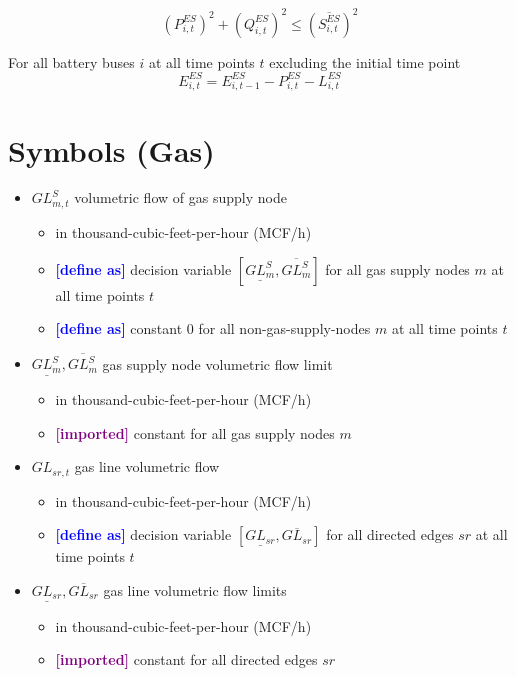 \documentclass{article}
\newcommand{\lo}[1]{\underline{#1}}
\newcommand{\hi}[1]{\overline{#1}}
\newcommand{\define}{\textcolor{blue}{\textbf{[define as] }}}
\newcommand{\imported}{\textcolor{purple}{\textbf{[imported] }}}
\begin{document}
\begin{equation}
  (P^{ES}_{i,t})^2 + (Q^{ES}_{i,t})^2 \leq (\hi{S^{ES}_{i,t}})^2
\end{equation}

For all battery buses $i$ at all time points $t$ excluding the initial time
point
\begin{equation}
  E^{ES}_{i,t} = E^{ES}_{i,t-1} - P^{ES}_{i,t} - L^{ES}_{i,t}
\end{equation}








\section{Symbols (Gas)}
\begin{itemize}
\item $GL^S_{m,t}$ volumetric flow of gas supply node
  \begin{itemize}
  \item in thousand-cubic-feet-per-hour (MCF/h)
  \item \define decision variable $[\lo{GL^S_m}, \hi{GL^S_m}]$ for all gas
    supply nodes $m$ at all time points $t$
  \item \define constant $0$ for all non-gas-supply-nodes $m$ at all time
    points $t$
  \end{itemize}

\item $\lo{GL^S_m}, \hi{GL^S_m}$ gas supply node volumetric flow limit
  \begin{itemize}
  \item in thousand-cubic-feet-per-hour (MCF/h)
  \item \imported constant for all gas supply nodes $m$
  \end{itemize}

\item $GL_{sr,t}$ gas line volumetric flow
  \begin{itemize}
  \item in thousand-cubic-feet-per-hour (MCF/h)
  \item \define decision variable $[\lo{GL_{sr}}, \hi{GL_{sr}}]$ for all
    directed edges $sr$ at all time points $t$
  \end{itemize}

\item $\lo{GL_{sr}}, \hi{GL_{sr}}$ gas line volumetric flow limits
  \begin{itemize}
  \item in thousand-cubic-feet-per-hour (MCF/h)
  \item \imported constant for all directed edges $sr$
  \end{itemize}


\end{itemize}
\end{document}
